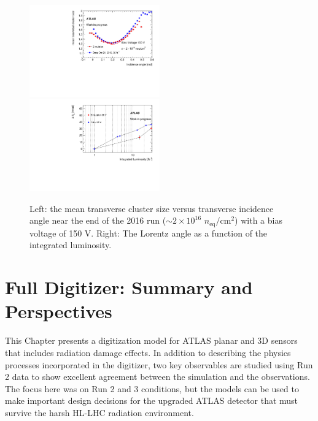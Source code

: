 \begin{figure}[h!]
\centering
\includegraphics[width=0.5\textwidth]{profile_rad_sizeX_debug_f2e14_V150_BenMap_100k_2x2_mapLorentzOK_311071_Chiocchia_withdate_and_lumi.pdf}
\includegraphics[width=0.5\textwidth]{MultiProfile_LorAngVsLumi_03_45.pdf}
\caption{Left: the mean transverse cluster size versus transverse incidence angle near the end of the 2016 run ($\sim2\times 10^{16}$ $n_\text{eq}/\text{cm}^2$) with a bias voltage of 150 V.  Right: The Lorentz angle as a function of the integrated luminosity.}
\label{fig:LA2:Run2}
\end{figure}






\section{Full Digitizer: Summary and Perspectives}
\label{sec:digiconclusions}



This Chapter presents a digitization model for ATLAS planar and 3D sensors that includes radiation damage effects.  In addition to describing the physics processes incorporated in the digitizer, two key observables are studied using Run 2 data to show excellent agreement between the simulation and the observations. The focus here was on Run 2 and 3 conditions, but the models can be used to make important design decisions for the upgraded ATLAS detector that must survive the harsh HL-LHC radiation environment.


